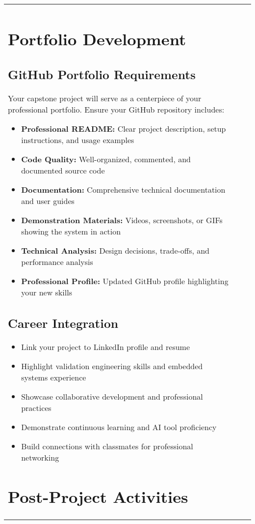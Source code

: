 \documentclass[11pt,a4paper]{article}
\begin{document}
\begin{center}
\begin{tabular}{|l|c|l|}
\begin{itemize}
\begin{itemize}
\section{Portfolio Development}

\subsection{GitHub Portfolio Requirements}
Your capstone project will serve as a centerpiece of your professional portfolio. Ensure your GitHub repository includes:

\begin{itemize}
    \item \textbf{Professional README:} Clear project description, setup instructions, and usage examples
    \item \textbf{Code Quality:} Well-organized, commented, and documented source code
    \item \textbf{Documentation:} Comprehensive technical documentation and user guides
    \item \textbf{Demonstration Materials:} Videos, screenshots, or GIFs showing the system in action
    \item \textbf{Technical Analysis:} Design decisions, trade-offs, and performance analysis
    \item \textbf{Professional Profile:} Updated GitHub profile highlighting your new skills
\end{itemize}

\subsection{Career Integration}
\begin{itemize}
    \item Link your project to LinkedIn profile and resume
    \item Highlight validation engineering skills and embedded systems experience
    \item Showcase collaborative development and professional practices
    \item Demonstrate continuous learning and AI tool proficiency
    \item Build connections with classmates for professional networking
\end{itemize}

\section{Post-Project Activities}


\end{itemize}
\end{itemize}
\end{tabular}
\end{center}
\end{document}
